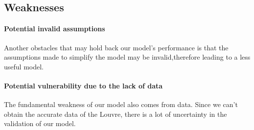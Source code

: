 
\subsection{Weaknesses}
    \paragraph{Potential invalid assumptions}Another obstacles that may hold back our model's performance is that the assumptions made to simplify the model may be invalid,therefore leading to a less useful model.
    \paragraph{Potential vulnerability due to the lack of data} The fundamental weakness of our model also comes from data. Since we can't obtain the accurate data of the Louvre, there is a lot of uncertainty in the validation of our model.
    \paragraph{}



\newpage



\newpage

